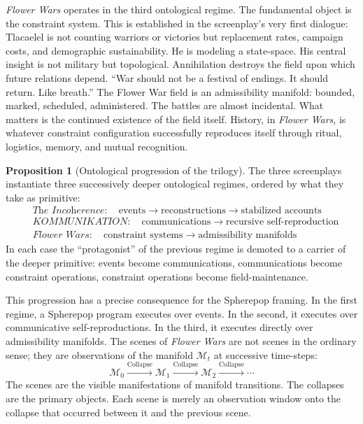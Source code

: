 \documentclass[11pt, a4paper]{article}
\theoremstyle{definition}
\newtheorem{proposition}{Proposition}
\theoremstyle{remark}
\begin{document}
\textit{Flower Wars} operates in the third ontological regime. The fundamental
object is the constraint system. This is established in the screenplay's very
first dialogue: Tlacaelel is not counting warriors or victories but replacement
rates, campaign costs, and demographic sustainability. He is modeling a
state-space. His central insight is not military but topological. Annihilation
destroys the field upon which future relations depend. ``War should not be a
festival of endings. It should return. Like breath.'' The Flower War field is
an admissibility manifold: bounded, marked, scheduled, administered. The
battles are almost incidental. What matters is the continued existence of
the field itself. History, in \textit{Flower Wars}, is whatever constraint
configuration successfully reproduces itself through ritual, logistics, memory,
and mutual recognition.

\begin{proposition}[Ontological progression of the trilogy]
The three screenplays instantiate three successively deeper ontological
regimes, ordered by what they take as primitive:
\begin{align*}
&\textit{The Incoherence}: \quad \text{events} \to \text{reconstructions} \to \text{stabilized accounts} \\
&\textit{KOMMUNIKATION}: \quad \text{communications} \to \text{recursive self-reproduction} \\
&\textit{Flower Wars}: \quad \text{constraint systems} \to \text{admissibility manifolds}
\end{align*}
In each case the ``protagonist'' of the previous regime is demoted to a
carrier of the deeper primitive: events become communications, communications
become constraint operations, constraint operations become field-maintenance.
\end{proposition}

This progression has a precise consequence for the Spherepop framing. In
the first regime, a Spherepop program executes over events. In the second,
it executes over communicative self-reproductions. In the third, it executes
directly over admissibility manifolds. The scenes of \textit{Flower Wars}
are not scenes in the ordinary sense; they are observations of the manifold
$\mathcal{M}_t$ at successive time-steps:
\[
\mathcal{M}_0 \xrightarrow{\mathrm{Collapse}} \mathcal{M}_1
\xrightarrow{\mathrm{Collapse}} \mathcal{M}_2 \xrightarrow{\mathrm{Collapse}}
\cdots
\]
The scenes are the visible manifestations of manifold transitions. The collapses
are the primary objects. Each scene is merely an observation window onto the
collapse that occurred between it and the previous scene.
\end{document}
